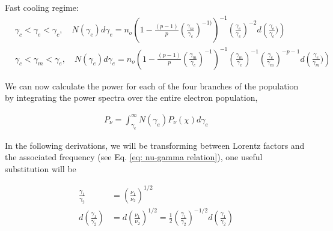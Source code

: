 \documentclass[linenumbers,twocolumn]{aastex631}
\begin{document}
\begin{appendix}
Fast cooling regime:
\begin{align}
	&\gamma_c < \gamma_e < \gamma_c,\quad N(\gamma_e)d\gamma_e = n_o \left(1 - \frac{(p-1)}{p} \left(\frac{\gamma_m}{\gamma_c}\right)^{-1)}\right)^{-1} \left(\frac{\gamma_e}{\gamma_c}\right)^{-2} d\left(\frac{\gamma_e}{\gamma_c})\right)\\
	&\gamma_c < \gamma_m < \gamma_e,\quad N(\gamma_e)d\gamma_e = n_o \left(1 - \frac{(p-1)}{p} \left(\frac{\gamma_m}{\gamma_c}\right)^{-1}\right)^{-1} \left(\frac{\gamma_m}{\gamma_c}\right)^{-1}\left(\frac{\gamma_e}{\gamma_m}\right)^{-p-1} d\left(\frac{\gamma_e}{\gamma_m})\right)
\end{align}

We can now calculate the power for each of the four branches of the population by integrating the power spectra over the entire electron population, 

\begin{align}
	P_\nu = \int_{\gamma_e}^{\infty} N(\gamma_e) P_\nu(\chi) d\gamma_e
\end{align}

In the following derivations, we will be transforming between Lorentz factors and the associated frequency (see Eq. \ref{eq: nu-gamma relation}), one useful substitution will be

\begin{align}
	\frac{\gamma_1}{\gamma_2} &= \left(\frac{\nu_1}{\nu_2}\right)^{1/2} \\
	d\left(\frac{\gamma_1}{\gamma_2}\right) &= d\left(\frac{\nu_1}{\nu_2}\right)^{1/2} = \frac{1}{2} \left(\frac{\gamma_1}{\gamma_2}\right)^{-1/2} d\left(\frac{\gamma_1}{\gamma_2}\right)
\end{align}


\end{appendix}
\end{document}
